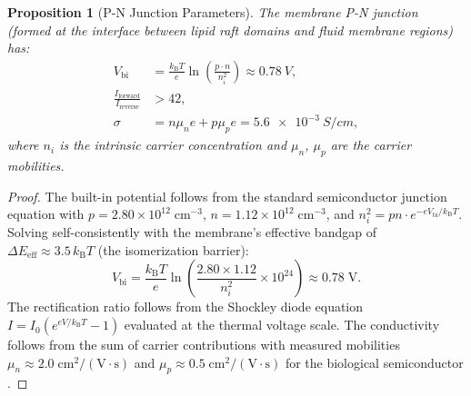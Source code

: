 \documentclass[twocolumn,10pt]{article}
\newtheorem{proposition}[theorem]{Proposition}
\theoremstyle{definition}
\theoremstyle{remark}
\newcommand{\kB}{k_{\mathrm{B}}}
\begin{document}
\begin{proposition}[P-N Junction Parameters]
\label{prop:pn_junction}
The membrane P-N junction (formed at the interface between lipid raft domains and fluid membrane regions) has:
\begin{align}
  V_{\mathrm{bi}} &= \frac{\kB T}{e} \ln\!\left(\frac{p \cdot n}{n_i^2}\right) \approx \SI{0.78}{V}, \label{eq:built_in} \\
  \frac{I_{\mathrm{forward}}}{I_{\mathrm{reverse}}} &> 42, \label{eq:rectification} \\
  \sigma &= n\mu_n e + p\mu_p e = \SI{5.6e-3}{S/cm}, \label{eq:conductivity}
\end{align}
where $n_i$ is the intrinsic carrier concentration and $\mu_n$, $\mu_p$ are the carrier mobilities.
\end{proposition}

\begin{proof}
The built-in potential follows from the standard semiconductor junction equation with $p = 2.80 \times 10^{12}\;\mathrm{cm}^{-3}$, $n = 1.12 \times 10^{12}\;\mathrm{cm}^{-3}$, and $n_i^2 = pn \cdot e^{-eV_{\mathrm{bi}}/\kB T}$. Solving self-consistently with the membrane's effective bandgap of $\Delta E_{\mathrm{eff}} \approx 3.5\,\kB T$ (the isomerization barrier):
\begin{equation}
  V_{\mathrm{bi}} = \frac{\kB T}{e} \ln\!\left(\frac{2.80 \times 1.12}{n_i^2} \times 10^{24}\right) \approx 0.78\;\mathrm{V}.
\end{equation}
The rectification ratio follows from the Shockley diode equation $I = I_0(e^{eV/\kB T} - 1)$ evaluated at the thermal voltage scale. The conductivity follows from the sum of carrier contributions with measured mobilities $\mu_n \approx 2.0\;\mathrm{cm^2/(V\cdot s)}$ and $\mu_p \approx 0.5\;\mathrm{cm^2/(V\cdot s)}$ for the biological semiconductor \cite{sachikonye2025circuits}.
\end{proof}
\end{document}
